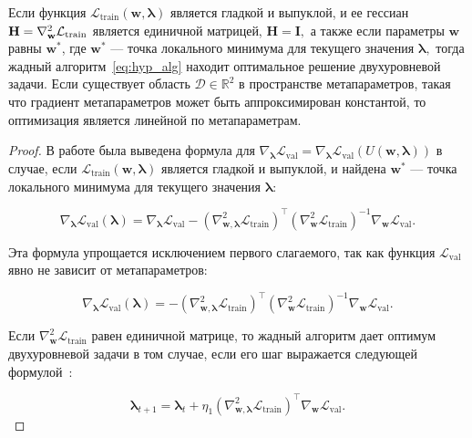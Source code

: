 \documentclass[12pt]{a&t}
\begin{document}
\begin{theorem}
Если функция $\mathcal{L}_{\text{train}}(\mathbf{w}, \boldsymbol{\lambda})$ является гладкой и выпуклой, и ее гессиан $\mathbf{H} = \nabla_{\mathbf{w}}^2 \mathcal{L}_\textnormal{train}$ является единичной матрицей, $\mathbf{H} = \mathbf{I},$ а также если параметры $\mathbf{w}$ равны $\mathbf{w}^*$, где $\mathbf{w}^*$ --- точка локального минимума для текущего значения $\boldsymbol{\lambda},$ тогда жадный алгоритм~\eqref{eq:hyp_alg} находит оптимальное решение двухуровневой задачи. Если существует область $\mathcal{D} \in \mathbb{R}^2$ в пространстве метапараметров, такая что градиент метапараметров может быть аппроксимирован константой, то оптимизация является линейной по метапараметрам.
\end{theorem}

\begin{proof} 
В работе \cite{journals/corr/Pedregosa16} была выведена формула для $\nabla_{\boldsymbol{\lambda}}\mathcal{L}_\text{val} = \nabla_{\boldsymbol{\lambda}}\mathcal{L}_\text{val}(U(\mathbf{w}, \boldsymbol{\lambda}))$ в случае, если $\mathcal{L}_\text{train}(\textbf{w}, \boldsymbol{\lambda})$ является гладкой и выпуклой, и найдена $\mathbf{w}^*$ --- точка локального минимума для текущего значения $\boldsymbol{\lambda}$:

$$
    \nabla_{\boldsymbol{\lambda}}\mathcal{L}_\text{val}(\boldsymbol{\lambda}) = \nabla_{\boldsymbol{\lambda}}\mathcal{L}_\text{val} - (\nabla_{\textbf{w}, \boldsymbol{\lambda}}^2\mathcal{L}_\text{train})^\top(\nabla_{\textbf{w}}^2\mathcal{L}_\text{train})^{-1}\nabla_{\textbf{w}}\mathcal{L}_\text{val}.
$$

Эта формула упрощается исключением первого слагаемого, так как функция $\mathcal{L}_\text{val}$ явно не зависит от метапараметров:

$$
    \nabla_{\boldsymbol{\lambda}}\mathcal{L}_\text{val}(\boldsymbol{\lambda}) = - (\nabla_{\textbf{w}, \boldsymbol{\lambda}}^2\mathcal{L}_\text{train})^\top(\nabla_{\textbf{w}}^2\mathcal{L}_\text{train})^{-1}\nabla_{\textbf{w}}\mathcal{L}_\text{val}.
$$

Если $\nabla_{\textbf{w}}^2 \mathcal{L}_\text{train}$ равен единичной матрице, то жадный алгоритм дает оптимум двухуровневой задачи в том случае, если его шаг выражается следующей формулой~\cite{journals/corr/LuketinaBR15}:

$$
    \boldsymbol{\lambda}_{t+1} = \boldsymbol{\lambda}_{t} + \eta_1(\nabla_{\textbf{w}, \boldsymbol{\lambda}}^2\mathcal{L}_\text{train})^\top\nabla_{\textbf{w}}\mathcal{L}_\text{val}.
$$


\end{proof}
\end{document}
